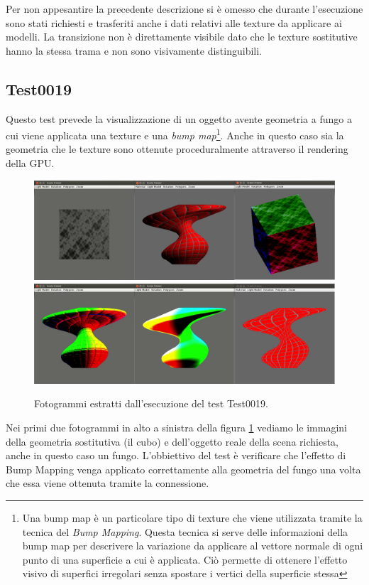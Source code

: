 Per non appesantire la precedente descrizione si \`e omesso che durante l'esecuzione sono stati richiesti e trasferiti anche i dati relativi alle texture da applicare ai modelli. La transizione non \`e direttamente visibile dato che le texture sostitutive hanno la stessa trama e non sono visivamente distinguibili.

\subsection{Test0019}
Questo test prevede la visualizzazione di un oggetto avente geometria a fungo a cui viene applicata una texture e una \textit{bump map}\footnote{Una bump map \`e un particolare tipo di texture che viene utilizzata tramite la tecnica del \textit{Bump Mapping}. Questa tecnica si serve delle informazioni della bump map per descrivere la variazione da applicare al vettore normale di ogni punto di una superficie a cui \`e applicata. Ci\`o permette di ottenere l'effetto visivo di superfici irregolari senza spostare i vertici della superficie stessa}. Anche in questo caso sia la geometria che le texture sono ottenute proceduralmente attraverso il rendering della \ac{GPU}.
\begin{figure}%
\begin{center}
\includegraphics[width=\textwidth]{Immagini/test0019/test0019-wall1}
\includegraphics[width=\textwidth]{Immagini/test0019/test0019-wall2}
\caption{Fotogrammi estratti dall'esecuzione del test Test0019. \label{f:test0019-wall}} 
\end{center} 
\end{figure}
Nei primi due fotogrammi in alto a sinistra della figura \ref{f:test0019-wall} vediamo le immagini della geometria sostitutiva (il cubo) e dell'oggetto reale della scena richiesta, anche in questo caso un fungo. L'obbiettivo del test \`e verificare che l'effetto di Bump Mapping venga applicato correttamente alla geometria del fungo una volta che essa viene ottenuta tramite la connessione.
